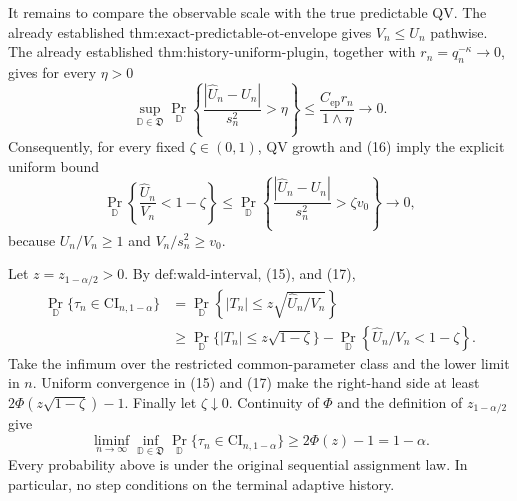 It remains to compare the observable scale with the true predictable QV.  The already established \(\text{thm:exact-predictable-ot-envelope}\) gives \(V_n\le U_n\) pathwise.  The already established \(\text{thm:history-uniform-plugin}\), together with \(r_n=q_n^{-\kappa}\to0\), gives for every \(\eta>0\)
\[
\sup_{\mathbb D\in\mathfrak D}
\Pr_{\mathbb D}\!\left\{\frac{|\widehat U_n-U_n|}{s_n^2}>\eta\right\}
\le\frac{C_{\mathrm{ep}}r_n}{1\wedge\eta}\longrightarrow0.
\tag{16}
\]
Consequently, for every fixed \(\zeta\in(0,1)\), QV growth and (16) imply the explicit uniform bound
\[
\Pr_{\mathbb D}\!\left\{\frac{\widehat U_n}{V_n}<1-\zeta\right\}
\le
\Pr_{\mathbb D}\!\left\{\frac{|\widehat U_n-U_n|}{s_n^2}>\zeta v_0\right\}
\longrightarrow0,
\tag{17}
\]
because \(U_n/V_n\ge1\) and \(V_n/s_n^2\ge v_0\).

Let \(z=z_{1-\alpha/2}>0\).  By \(\text{def:wald-interval}\), (15), and (17),
\[
\begin{aligned}
\Pr_{\mathbb D}\{\tau_n\in\mathrm{CI}_{n,1-\alpha}\}
&=\Pr_{\mathbb D}\!\left\{|T_n|\le z\sqrt{\widehat U_n/V_n}\right\}\\
&\ge \Pr_{\mathbb D}\{|T_n|\le z\sqrt{1-\zeta}\}
-\Pr_{\mathbb D}\!\left\{\widehat U_n/V_n<1-\zeta\right\}.
\end{aligned}
\tag{18}
\]
Take the infimum over the restricted common-parameter class and the lower limit in \(n\).  Uniform convergence in (15) and (17) make the right-hand side at least
\(2\Phi(z\sqrt{1-\zeta})-1\).  Finally let \(\zeta\downarrow0\).  Continuity of \(\Phi\) and the definition of \(z_{1-\alpha/2}\) give
\[
\liminf_{n\to\infty}\inf_{\mathbb D\in\mathfrak D}
\Pr_{\mathbb D}\{\tau_n\in\mathrm{CI}_{n,1-\alpha}\}
\ge2\Phi(z)-1=1-\alpha.
\tag{19}
\]
Every probability above is under the original sequential assignment law.  In particular, no step conditions on the terminal adaptive history.